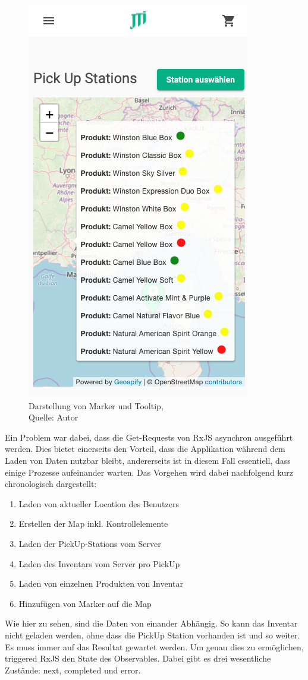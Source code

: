  \begin{figure}[H]
 	\centering
 	\includegraphics[scale=0.5]{images/tooltipCard.PNG}
 	\caption[Darstellung von Marker und Tooltip]{Darstellung von Marker und Tooltip,\\ Quelle: Autor}
 	\label{img: tooltipCard}
 \end{figure} 
 
 Ein Problem war dabei, dass die Get-Requests von RxJS asynchron ausgeführt werden. Dies bietet einerseits den Vorteil, dass die Applikation während dem Laden von Daten nutzbar bleibt, andererseits ist in diesem Fall essentiell, dass einige Prozesse aufeinander warten. Das Vorgehen wird dabei nachfolgend kurz chronologisch dargestellt: 
 \begin{enumerate}
 	\item Laden von aktueller Location des Benutzers
 	\item Erstellen der Map inkl. Kontrollelemente
 	\item Laden der PickUp-Stations vom Server
 	\item Laden des Inventars vom Server pro PickUp
 	\item Laden von einzelnen Produkten von Inventar
 	\item Hinzufügen von Marker auf die Map 
\end{enumerate}
Wie hier zu sehen, sind die Daten von einander Abhängig. So kann das Inventar nicht geladen werden, ohne dass die PickUp Station vorhanden ist und so weiter. Es muss immer auf das Resultat gewartet werden. Um genau dies zu ermöglichen, triggered RxJS den State des Observables. Dabei gibt es drei wesentliche Zustände: next, completed und error. 

